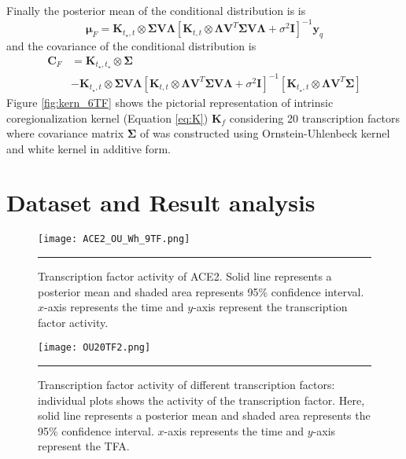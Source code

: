 Finally the posterior mean of the conditional distribution  is %
is
\begin{equation} \label{eq:prediction_MuF}
  \boldsymbol{\mu}_F = 
    \mathbf{K}_{t_\star,t} \otimes \boldsymbol{\Sigma} \mathbf{V} \boldsymbol{\Lambda}
    \left[ \mathbf{K}_{t,t} \otimes \boldsymbol{\Lambda} \mathbf{V}^T\boldsymbol{\Sigma} \mathbf{V} \boldsymbol{\Lambda} + \sigma^2 \mathbf{I} \right]^{-1}\mathbf{y}_q
\end{equation}
and the covariance of the conditional distribution is %
\begin{equation} \label{eq:prediction_CF}
\begin{split}
  \boldsymbol{C}_F &= 
    \mathbf{K}_{t_\star,t_\star} \otimes \boldsymbol{\Sigma} \\
    & - \mathbf{K}_{t_\star,t} \otimes \boldsymbol{\Sigma}\mathbf{V} \boldsymbol{\Lambda}
    \left[ \mathbf{K}_{t,t} \otimes \boldsymbol{\Lambda} \mathbf{V}^T\boldsymbol{\Sigma} \mathbf{V} \boldsymbol{\Lambda} + \sigma^2 \mathbf{I} \right]^{-1} 
    \left[ \mathbf{K}_{t_\star,t} \otimes \boldsymbol{\Lambda} \mathbf{V}^T\boldsymbol{\Sigma}\right]
\end{split}
\end{equation}
Figure \ref{fig:kern_6TF} shows the pictorial representation of intrinsic coregionalization kernel (Equation \ref{eq:K}) $\textbf{K}_f$ considering 20 transcription factors where covariance matrix $\boldsymbol{\Sigma}$ of  was constructed using Ornstein-Uhlenbeck kernel and white kernel in additive form.


\section{Dataset and Result analysis}
\begin{figure}[t]
	\centering
		\texttt{[image: ACE2\_OU\_Wh\_9TF.png]}
		\rule{35em}{0.5pt}
	\caption[Transcription factor activity of ACE2]
		{Transcription factor activity of ACE2. Solid line represents a posterior mean and shaded area represents 95\% confidence interval. $x$-axis represents the time and $y$-axis represent the transcription factor activity.}
	\label{fig:TFA_of_of_ACE2}
\end{figure}
\begin{figure}
	\centering
		\texttt{[image: OU20TF2.png]}
		\rule{35em}{0.5pt}
	\caption[Transcription factor activity of different transcription factor]{Transcription factor activity of different transcription factors: individual plots shows the activity of the transcription factor. Here, solid line represents a posterior mean and shaded area represents the 95\% confidence interval. $x$-axis represents the time and $y$-axis represent the TFA.}
	\label{fig:TFA_of_20TF}
\end{figure}

